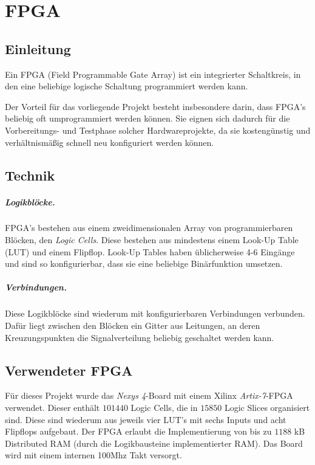 \chapter{FPGA} %
\label{FPGA} %

\section{Einleitung}
Ein FPGA (Field Programmable Gate Array) ist ein integrierter Schaltkreis, in den eine beliebige logische Schaltung programmiert werden kann.

Der Vorteil für das vorliegende Projekt besteht insbesondere darin, dass FPGA's beliebig oft umprogrammiert werden können. Sie eignen sich dadurch für die Vorbereitungs- und Testphase solcher Hardwareprojekte, da sie kostengünstig und verhältnismäßig schnell neu konfiguriert werden können.

\section{Technik}
\paragraph{Logikblöcke.} FPGA's bestehen aus einem zweidimensionalen Array von programmierbaren Blöcken, den \emph{Logic Cells}. Diese bestehen aus mindestens einem Look-Up Table (LUT) und einem Flipflop. Look-Up Tables haben üblicherweise 4-6 Eingänge und sind so konfigurierbar, dass sie eine beliebige Binärfunktion umsetzen.

\paragraph{Verbindungen.} Diese Logikblöcke sind wiederum mit konfigurierbaren Verbindungen verbunden. Dafür liegt zwischen den Blöcken ein Gitter aus Leitungen, an deren Kreuzungspunkten die Signalverteilung beliebig geschaltet werden kann.

\section{Verwendeter FPGA}
Für dieses Projekt wurde das \emph{Nexys 4}-Board mit einem Xilinx \emph{Artix-7}-FPGA verwendet. Dieser enthält $101440$ Logic Cells, die in $15850$ Logic Slices organisiert sind. Diese sind wiederum aus jeweils vier LUT's mit sechs Inputs und acht Flipflops aufgebaut. Der FPGA erlaubt die Implementierung von bis zu $1188$ kB Distributed RAM (durch die Logikbausteine implementierter RAM). Das Board wird mit einem internen 100Mhz Takt versorgt. \cite{Artix}